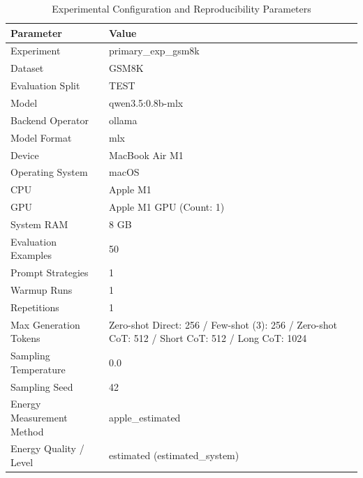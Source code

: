 \begin{table}
\caption{Experimental Configuration and Reproducibility Parameters}
\label{tab:experimental_configuration}
\begin{tabular}{ll}
\toprule
Parameter & Value \\
\midrule
Experiment & primary\_exp\_gsm8k \\
Dataset & GSM8K \\
Evaluation Split & TEST \\
Model & qwen3.5:0.8b-mlx \\
Backend Operator & ollama \\
Model Format & mlx \\
Device & MacBook Air M1 \\
Operating System & macOS \\
CPU & Apple M1 \\
GPU & Apple M1 GPU (Count: 1) \\
System RAM & 8 GB \\
Evaluation Examples & 50 \\
Prompt Strategies & 1 \\
Warmup Runs & 1 \\
Repetitions & 1 \\
Max Generation Tokens & Zero-shot Direct: 256 / Few-shot (3): 256 / Zero-shot CoT: 512 / Short CoT: 512 / Long CoT: 1024 \\
Sampling Temperature & 0.0 \\
Sampling Seed & 42 \\
Energy Measurement Method & apple\_estimated \\
Energy Quality / Level & estimated (estimated\_system) \\
\bottomrule
\end{tabular}
\end{table}
